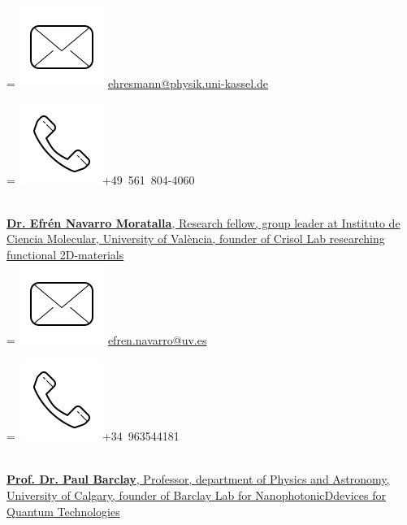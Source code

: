 \begin{adjustwidth}{2.5cm}{1.9cm}
\begingroup
{}=\hbox{
\includegraphics[scale=0.1,trim={0 1cm 0cm 0cm}]{icons/main/mail.png}\hspace{0.1cm}
\href{mailto:ehresmann@physik.uni-kassel.de}{ehresmann@physik.uni-kassel.de} 
}
\parbox{\wd0}{}
\endgroup
\begingroup
{}=\hbox{
\includegraphics[scale=0.1,trim={0 1.25cm -0.4cm 0cm}]{icons/main/phone.png}\hspace{0.1cm}+49 561 804-4060
}
\parbox{\wd0}{}\endgroup
\\
\sectionsep
\href{https://crisol-lab.com/people/} {\textbf{Dr. Efrén Navarro Moratalla}, Research fellow, group leader at Instituto de Ciencia Molecular, University of València, founder of Crisol Lab researching functional 2D-materials} 
\\
\begingroup
{}=\hbox{
\includegraphics[scale=0.1,trim={0 1cm 0cm 0cm}]{icons/main/mail.png}\hspace{0.1cm}  	\href{mailto:efren.navarro@uv.es}{efren.navarro@uv.es}
}
\parbox{\wd0}{}
\endgroup
\begingroup
{}=\hbox{
\includegraphics[scale=0.1,trim={0 1.25cm -0.4cm 0cm}]{icons/main/phone.png}\hspace{0.1cm}+34 963544181
}
\parbox{\wd0}{}\endgroup
\\
\sectionsep
\href{https://barclaylab.ucalgary.ca/people/} {\textbf{Prof. Dr. Paul Barclay}, Professor, department of Physics and Astronomy, University of Calgary, founder of Barclay Lab for NanophotonicDdevices for Quantum Technologies} 

\end{adjustwidth}
